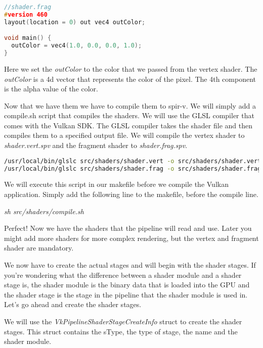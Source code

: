 \documentclass[12pt]{report} \usepackage{preamble}
\begin{document}
\begin{lstlisting}[language=C++]
//shader.frag
#version 460
layout(location = 0) out vec4 outColor;

void main() {
  outColor = vec4(1.0, 0.0, 0.0, 1.0);
}
\end{lstlisting}

Here we set the \textit{outColor} to the color that we passed from the vertex shader. The \textit{outColor} is a 4d vector
that represents the color of the pixel. The 4th component is the alpha value of the color.

Now that we have them we have to compile them to spir-v. We will simply add a compile.sh script that compiles the shaders. We will
use the \ac{GLSL} compiler that comes with the Vulkan SDK. The \ac{GLSL} compiler takes the shader file and then compiles
them to a specified output file. We will compile the vertex shader to \textit{shader.vert.spv} and the fragment shader to
\textit{shader.frag.spv}.

\begin{lstlisting}[language=bash]
/usr/local/bin/glslc src/shaders/shader.vert -o src/shaders/shader.vert.spv
/usr/local/bin/glslc src/shaders/shader.frag -o src/shaders/shader.frag.spv
\end{lstlisting}

We will execute this script in our makefile before we compile the Vulkan application.
Simply add the following line to the makefile, before the compile line.

\textit{sh src/shaders/compile.sh}

Perfect! Now we have the shaders that the pipeline will read and use. Later you might add more shaders for more complex
rendering, but the vertex and fragment shader are mandatory.

We now have to create the actual stages and will begin with the shader stages. If you're wondering what the difference
between a shader module and a shader stage is, the shader module is the binary data that is loaded into the \ac{GPU} and the
shader stage is the stage in the pipeline that the shader module is used in. Let's go ahead and create the shader stages.

We will use the \textit{VkPipelineShaderStageCreateInfo} struct to create the shader stages. This struct contains the
sType, the type of stage, the name and the shader module.
\end{document}

